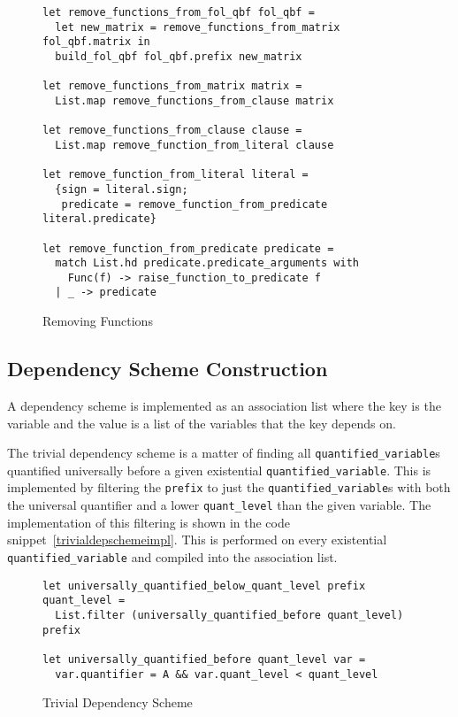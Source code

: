 \begin{figure}[H]
\caption{Removing Functions}
\begin{CenteredBox}
\begin{lstlisting}[language=caml, label=removingfunctionsimpl]
let remove_functions_from_fol_qbf fol_qbf =
  let new_matrix = remove_functions_from_matrix fol_qbf.matrix in
  build_fol_qbf fol_qbf.prefix new_matrix

let remove_functions_from_matrix matrix =
  List.map remove_functions_from_clause matrix

let remove_functions_from_clause clause =
  List.map remove_function_from_literal clause

let remove_function_from_literal literal =
  {sign = literal.sign; 
   predicate = remove_function_from_predicate literal.predicate}

let remove_function_from_predicate predicate =
  match List.hd predicate.predicate_arguments with
    Func(f) -> raise_function_to_predicate f
  | _ -> predicate
\end{lstlisting}
\end{CenteredBox}
\end{figure}

\subsection{Dependency Scheme Construction} \label{devdepscheme}
A dependency scheme is implemented as an association list where the key is the variable and the value is a list of the variables that the key depends on.

The trivial dependency scheme is a matter of finding all \texttt{quantified\_variable}s quantified universally before a given existential \texttt{quantified\_variable}. This is implemented by filtering the \texttt{prefix} to just the \texttt{quantified\_variable}s with both the universal quantifier and a lower \texttt{quant\_level} than the given variable. The implementation of this filtering is shown in the code snippet~\ref{trivialdepschemeimpl}. This is performed on every existential \texttt{quantified\_variable} and compiled into the association list.

\begin{figure}[H]
\caption{Trivial Dependency Scheme}
\begin{CenteredBox}
\begin{lstlisting}[language=caml, label=trivialdepschemeimpl]
let universally_quantified_below_quant_level prefix quant_level =
  List.filter (universally_quantified_before quant_level) prefix

let universally_quantified_before quant_level var =
  var.quantifier = A && var.quant_level < quant_level
\end{lstlisting}
\end{CenteredBox}
\end{figure}

